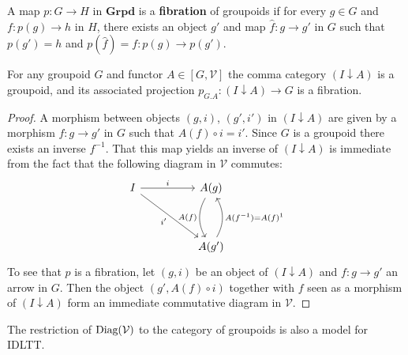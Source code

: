 \begin{defn}
A map $p : G \to H$ in $\textbf{Grpd}$ is a \textbf{fibration} of groupoids if for every $g \in G$
and $f : p(g) \to h$ in $H$, there exists an object $g'$ and map $\hat f : g \to g'$ in $G$ such that $p(g') = h$ and $p(\hat f) = f : p(g) \to p(g')$.
\end{defn}
\begin{lem}
For any groupoid $G$ and functor $A \in [G, \mathcal{V}]$ the comma category $(I \downarrow A)$ is a groupoid, and its associated projection $p_{G.A} : (I \downarrow A) \to G$ is a fibration.
\begin{proof}
A morphism between objects $(g, i)$, $(g', i')$ in $(I \downarrow A)$ are given by a morphism $f : g \to g'$ in $G$ such that $A(f) \circ i = i'$. Since $G$ is a groupoid there exists an inverse $f^{-1}$. That this map yields an inverse of $(I \downarrow A)$ is immediate from the fact that the following diagram in $\mathcal{V}$ commutes:
\[
\ti
I \ar[rd,"i'",swap] \ar[r, "i"] & A(g) \ar[d, "A(f)", bend right,swap] \\
& A(g') \ar[u, "A(f^{-1}) = A(f)^{1}", bend right,swap]
\kz
\]
To see that $p$ is a fibration, let $(g, i)$ be an object of $(I \downarrow A)$ and $f : g \to g'$ an arrow in $G$. Then the object $(g', A(f)\circ i)$ together with $f$ seen as a morphism of $(I \downarrow A)$ form an immediate commutative diagram in $\mathcal{V}$.
\end{proof}
\end{lem}
\begin{cor}
The restriction of $\operatorname{\text{Diag}}(\mathcal{V})$ to the category of groupoids is also a model for IDLTT.
\end{cor}
